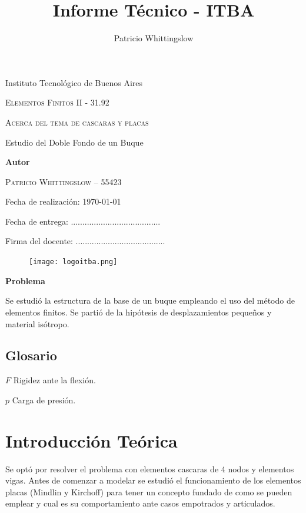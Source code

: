 \documentclass[onecolumn,10pt,titlepage]{article}
\title{Informe Técnico - ITBA}
\author{Patricio Whittingslow}
\newcommand{\glossentry}[2]{$#1$ \indent #2 \par \vspace{.4cm} }
\begin{document}
\begin{titlepage}
	\centering
	
	{ \large Instituto Tecnológico de Buenos Aires  \par }
	\vspace{2cm}
	{\Large \scshape Elementos Finitos II - 31.92 \par}
	\vspace{2cm}
	{\Huge \scshape Acerca del tema de cascaras y placas\par }
	\vspace{.5cm}
	{\Large Estudio del Doble Fondo de un Buque \par}
	\vspace{2cm}
	{\large \bf Autor \par}
	\vspace{.5cm}
	\textsc{\large Patricio Whittingslow -- 55423}
	\vspace{2cm}
	{\par \large Fecha de realización: \today \par}
	\vspace{1cm}
	{\large Fecha de entrega: .......................................\par}
	\vspace{2.5cm}
	{\large Firma del docente: .......................................}
	\vspace{3cm}
	\begin{figure}[htb!]
		\centering
		\texttt{[image: logoitba.png]}
	\end{figure}
\end{titlepage}


{\textbf{Problema}}\par
Se estudió la estructura de la base de un buque empleando el uso del método de elementos finitos. Se partió de la hipótesis de desplazamientos pequeños y material isótropo.

\begin{multicols}{2}
	\section*{Glosario}
	\glossentry{F}{Rigidez ante la flexión.}
	\glossentry{p}{Carga de presión.}
\end{multicols}


\tableofcontents


\section{Introducción Teórica}
Se optó por resolver el problema con elementos cascaras de 4 nodos y elementos vigas. Antes de comenzar a modelar se estudió el funcionamiento de los elementos placas (Mindlin y Kirchoff) para tener un concepto fundado de como se pueden emplear y cual es su comportamiento ante casos empotrados y articulados.
\end{document}
